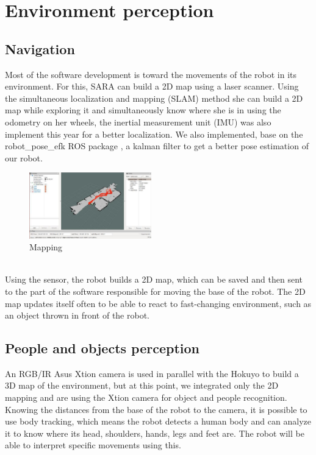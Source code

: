 \documentclass[runningheads,a4paper]{llncs}
\begin{document}
\section{Environment perception}
\subsection{Navigation}
\tab Most of the software development is toward the movements of the robot in its environment. For this, SARA can build a 2D map using a laser scanner. Using the simultaneous localization and mapping (SLAM) method she can build a 2D map while exploring it and simultaneously know where she is in using the odometry on her wheels, the inertial measurement unit (IMU) was also implement this year for a better localization. We also implemented, base on the robot\_pose\_efk ROS package \cite{poseefk}, a kalman filter to get a better pose estimation of our robot. \\
\begin{figure}
  \centering
  \includegraphics[width=150pt]{images/map.jpg}
  \caption{Mapping}
\end{figure}\\
Using the sensor, the robot builds a 2D map, which can be saved and then sent to the part of the software responsible for moving the base of the robot. The 2D map updates itself often to be able to react to fast-changing environment, such as an object thrown in front of the robot.



\subsection{People and objects perception}
\tab An RGB/IR Asus Xtion camera is used in parallel with the Hokuyo to build a 3D map of the environment, but at this point, we integrated only the 2D mapping and are using the Xtion camera for object and people recognition. Knowing the distances from the base of the robot to the camera, it is possible to use body tracking, which means the robot detects a human body and can analyze it to know where its head, shoulders, hands, legs and feet are. The robot will be able to interpret specific movements using this. \\
\end{document}

